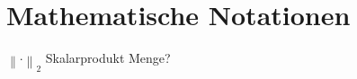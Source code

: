 \chapter*{Mathematische Notationen}
\label{mathematische_notationen}

$\left\|\cdot\right\|_2$
Skalarprodukt
Menge?
